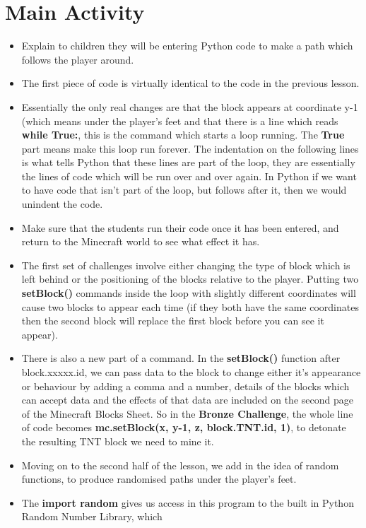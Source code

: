 \documentclass{geocraft-lesson-plan}
\begin{document}
\section*{Main Activity}
\begin{itemize}
\item Explain to children they will be entering Python code to make a path which follows the player around. 
\item The first piece of code is virtually identical to the code in the previous lesson. 
\item Essentially the only real changes are that the block appears at coordinate y-1 (which means under the player's
feet and that there is a line which reads \textbf{while True:}, this is the command which starts a loop running. The
\textbf{True} part means make this loop run forever. The indentation on the following lines is what tells Python that
these lines are part of the loop, they are essentially the lines of code which will be run over and over again. In
Python if we want to have code that isn't part of the loop, but follows after it, then we would unindent the code.
\item Make sure that the students run their code once it has been entered, and return to the Minecraft world to see what
effect it has.
\item The first set of challenges involve either changing the type of block which is left behind or the positioning of
  the blocks relative to the player. Putting two \textbf{setBlock()} commands inside the loop with slightly different
  coordinates will cause two blocks to appear each time (if they both have the same coordinates then the second block will
  replace the first block before you can see it appear).
\item There is also a new part of a command. In the \textbf{setBlock()} function after block.xxxxx.id, we can pass data
to the block to change either it's appearance or behaviour by adding a comma and a number, details of the blocks which
can accept data and the effects of that data are included on the second page of the Minecraft Blocks Sheet. So in the
\textbf{Bronze Challenge}, the whole line of code becomes \textbf{mc.setBlock(x, y-1, z, block.TNT.id, 1)}, to detonate the
resulting TNT block we need to mine it.
\item Moving on to the second half of the lesson, we add in the idea of random functions, to produce randomised paths
  under the player's feet. 
\item The \textbf{import random} gives us access in this program to the built in Python Random Number Library, which

\end{itemize}
\end{document}
